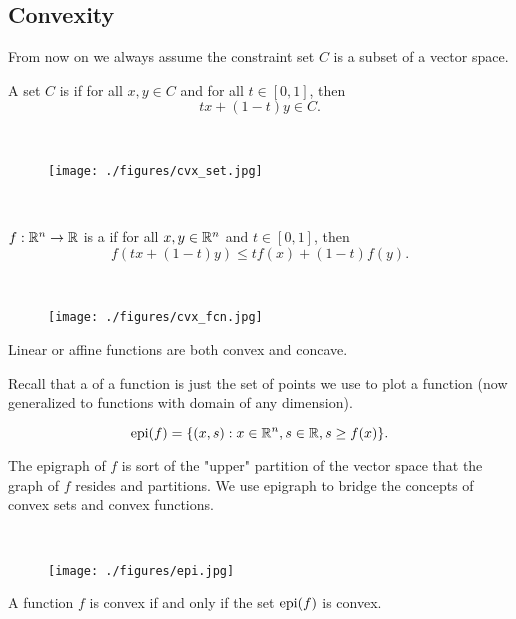 \documentclass[class=article,crop=false]{standalone}
\begin{document}
\subsection{Convexity}
\begin{note}
	From now on we always assume the constraint set $ C$ is a subset of a vector space.
\end{note}
\begin{defn}
	A set $ C$ is   if for all $ x,y \in C$ and for all $ t \in [0,1]$, then
	\[
		tx + (1-t)y \in C
	.\] 
\end{defn}

~\begin{figure}[H]
	\centering
	\texttt{[image: ./figures/cvx\_set.jpg]}
\end{figure}
~\begin{defn}
	$ f : \mathbb{R}^{n} \to \mathbb{R}$ is a  if for all $ x,y \in \mathbb{R}^{n}$ and $ t \in [0,1]$, then
	\[
		f(t x+ (1-t)y) \leq t f(x) + (1-t) f(y)
	.\] 
\end{defn}
~\begin{figure}[H]
	\centering
	\texttt{[image: ./figures/cvx\_fcn.jpg]}
\end{figure}

\begin{remark}
Linear or affine functions are both convex and concave.
\end{remark}

Recall that a  of a function is just the set of points we use to plot a function (now generalized to functions with domain of any dimension).

\begin{defn}[epigraph]
\[
	\operatorname{epi}(f) = \{(x,s): x \in \mathbb{R}^{n}, s \in \mathbb{R}, s\geq f(x)\}  
.\] 
\end{defn}
\begin{intuition}
The epigraph of $ f$ is sort of the "upper" partition of the vector space that the graph of $ f$ resides and partitions. We use epigraph to bridge the concepts of convex sets and convex functions.
\end{intuition}

~\begin{figure}[H]
	\centering
	\texttt{[image: ./figures/epi.jpg]}
\end{figure}

\begin{prop}
	A function $ f$ is convex if and only if  the set $ \operatorname{epi}(f)$ is convex.
\end{prop}
\end{document}
